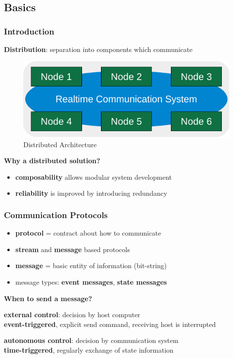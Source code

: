 \documentclass{beamer}
\renewcommand{\emph}[1]{\textbf{\textcolor{greeniot2}{#1}}}
\newcommand{\paragraph}[1]{\vspace{6pt}\textbf{#1}}
\begin{document}
\subsection{Basics}

\begin{frame}
  \frametitle{Introduction}
   
  \emph{Distribution}: separation into components which communicate
  
  \begin{figure}[H]
    \includegraphics[width=.7\textwidth]{images/node-com.pdf}
    \caption{Distributed Architecture}
  \end{figure}
  
  \paragraph{Why a distributed solution?}
  \begin{itemize}
    \item \emph{composability} allows modular system development
    \item \emph{reliability} is improved by introducing redundancy
  \end{itemize} 
\end{frame}

\begin{frame}
  \frametitle{Communication Protocols}
  
  \begin{itemize}
    \item \emph{protocol} = contract about how to communicate
    \item \emph{stream} and \emph{message} based protocols
    \item \emph{message} = basic entity of information (bit-string)
    \item message types: \emph{event messages}, \emph{state messages}
  \end{itemize}
  
  \paragraph{When to send a message?}
  
  \vspace{6pt}

  \emph{external control}: decision by host computer \\
  {\small \emph{event-triggered}, explicit send command, receiving host is interrupted}
  
  \vspace{6pt}
  
  \emph{autonomous control}: decision by communication system \\
  {\small \emph{time-triggered}, regularly exchange of state information}
\end{frame}
\end{document}
